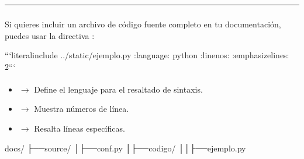 \documentclass[a4paper,10pt,oneside,spanish,openany]{sphinxmanual}
\begin{document}
\bigskip\hrule\bigskip



\subsubsection{}
\label{\detokenize{configuracion_inicial/013.guia_de_myst_parser:mostrar-archivos-de-codigo-completo}}
\sphinxAtStartPar
Si quieres incluir un archivo de código fuente completo en tu documentación, puedes usar la directiva :

\begin{sphinxVerbatim}[commandchars=\\\{\}]
```\PYGZob{}literalinclude\PYGZcb{} ../\PYGZus{}static/ejemplo.py
:language: python
:linenos:
:emphasize\PYGZhy{}lines: 2```
\end{sphinxVerbatim}


\paragraph{}
\label{\detokenize{configuracion_inicial/013.guia_de_myst_parser:parametros}}\begin{itemize}
\item {} 
\sphinxAtStartPar
{} \(\rightarrow\) Define el lenguaje para el resaltado de sintaxis.

\item {} 
\sphinxAtStartPar
{} \(\rightarrow\) Muestra números de línea.

\item {} 
\sphinxAtStartPar
{} \(\rightarrow\) Resalta líneas específicas.

\end{itemize}

\sphinxAtStartPar
{}

\begin{sphinxVerbatim}[commandchars=\\\{\}]
docs/
├──source/
│├──conf.py
│├──codigo/
││├──ejemplo.py
\end{sphinxVerbatim}

\sphinxAtStartPar
{}
\end{document}
